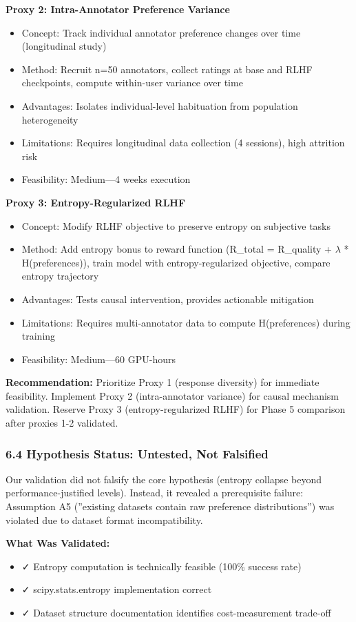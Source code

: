 \textbf{Proxy 2: Intra-Annotator Preference Variance}
\begin{itemize}
\item Concept: Track individual annotator preference changes over time (longitudinal study)
\item Method: Recruit n=50 annotators, collect ratings at base and RLHF checkpoints, compute within-user variance over time
\item Advantages: Isolates individual-level habituation from population heterogeneity
\item Limitations: Requires longitudinal data collection (4 sessions), high attrition risk
\item Feasibility: Medium---4 weeks execution
\end{itemize}

\textbf{Proxy 3: Entropy-Regularized RLHF}
\begin{itemize}
\item Concept: Modify RLHF objective to preserve entropy on subjective tasks
\item Method: Add entropy bonus to reward function (R\_total = R\_quality + $\lambda$ * H(preferences)), train model with entropy-regularized objective, compare entropy trajectory
\item Advantages: Tests causal intervention, provides actionable mitigation
\item Limitations: Requires multi-annotator data to compute H(preferences) during training
\item Feasibility: Medium---60 GPU-hours
\end{itemize}

\textbf{Recommendation:} Prioritize Proxy 1 (response diversity) for immediate feasibility. Implement Proxy 2 (intra-annotator variance) for causal mechanism validation. Reserve Proxy 3 (entropy-regularized RLHF) for Phase 5 comparison after proxies 1-2 validated.

\subsubsection{6.4 Hypothesis Status: Untested, Not Falsified}

Our validation did not falsify the core hypothesis (entropy collapse beyond performance-justified levels). Instead, it revealed a prerequisite failure: Assumption A5 (''existing datasets contain raw preference distributions'') was violated due to dataset format incompatibility.

\textbf{What Was Validated:}
\begin{itemize}
\item ✓ Entropy computation is technically feasible (100\% success rate)
\item ✓ scipy.stats.entropy implementation correct
\item ✓ Dataset structure documentation identifies cost-measurement trade-off
\end{itemize}

